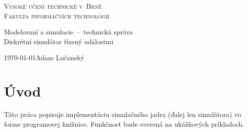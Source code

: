 \documentclass[11pt, a4paper, titlepage]{article}
\begin{document}
\begin{titlepage}

\begin{center}
{\Huge\textsc{Vysoké učení technické v~Brně}}\\
\medskip
{\huge\textsc{Fakulta informačních technologií}}\\

\LARGE{Modelovaní a simulacie\, -- \,technická správa} \\
\Huge{Diskrétní simulátor řízený událostmi} %

\end{center}

{\Large \today \hfill Adam Lučanský }
\end{titlepage}
\newpage

\section{Úvod}

Táto práca popisuje implementáciu simulačného jadra (ďalej len simulátora) vo forme programovej knižnice. Funkčnosť bude overená na ukážkových príkladoch.
%
%
%
\end{document}
